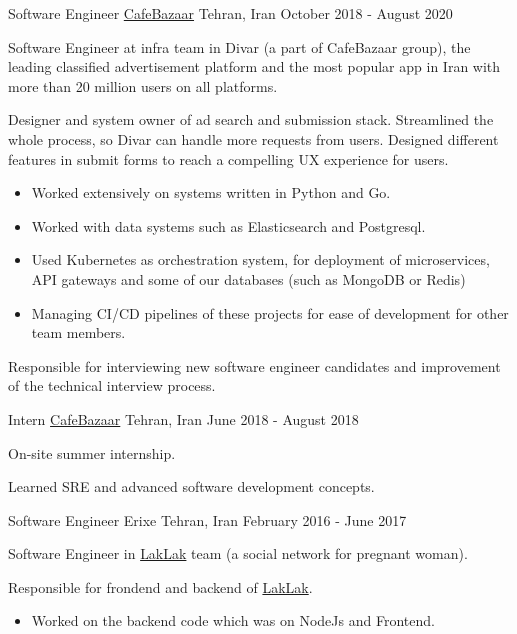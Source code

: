 \begin{cventries}
{\begin{cvitems}
\end{cvitems}
}
\cventry
{Software Engineer} %
{\href{https://cafebazaar.ir}{CafeBazaar}} %
{Tehran, Iran} %
{October 2018 - August 2020} %
{ %
\begin{cvitems}
\item {Software Engineer at infra team in Divar (a part of CafeBazaar group), the leading classified advertisement platform and the most popular app in Iran with more than 20 million users on all platforms.}
\item {Designer and system owner of ad search and submission stack. Streamlined the whole process, so Divar can handle more requests from users. Designed different features in submit forms to reach a compelling UX experience for users.}
\begin{itemize}
    \item Worked extensively on systems written in Python and Go.
    \item Worked with data systems such as Elasticsearch and Postgresql.
    \item Used Kubernetes as orchestration system, for deployment of microservices, API gateways and some of our databases (such as MongoDB or Redis)
    \item Managing CI/CD pipelines of these projects for ease of development for other team members.
\end{itemize}
\item {Responsible for interviewing new software engineer candidates and improvement of the technical interview process.}
\end{cvitems} 
}
\cventry
{Intern} %
{\href{https://cafebazaar.ir}{CafeBazaar}} %
{Tehran, Iran} %
{June 2018 - August 2018} %
{ %
\begin{cvitems}
\item {On-site summer internship.}
\item {Learned SRE and advanced software development concepts.}
\end{cvitems} 
}
\cventry
{Software Engineer} %
{Erixe} %
{Tehran, Iran} %
{February 2016 - June 2017} %
{ %
\begin{cvitems}
\item {Software Engineer in \href{https://cafebazaar.ir/app/com.laklakian.android?l=en}{LakLak} team (a social network for pregnant woman)}.
\item {Responsible for frondend and backend of \href{https://cafebazaar.ir/app/com.laklakian.android?l=en}{LakLak}.}
\begin{itemize}
    \item Worked on the backend code which was on NodeJs and Frontend.
\end{itemize}
\end{cvitems} 
}

\end{cventries}
